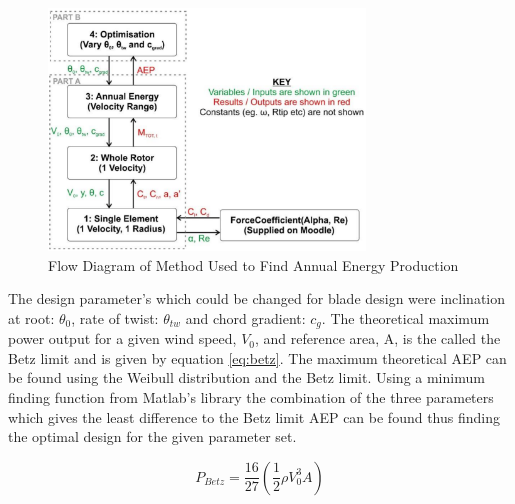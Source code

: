 \documentclass[11pt]{article}
\begin{document}
\begin{figure}[h!]
\centering
	\includegraphics[width=0.75\textwidth]{HandoutFlow}
	\caption{Flow Diagram of Method Used to Find Annual Energy Production \cite{handout}}\label{fig:handoutflow}
\end{figure}

The design parameter's which could be changed for blade design were inclination at root: $\theta_0$, rate of twist: $\theta_{tw}$ and chord gradient: $c_g$. The theoretical maximum power output for a given wind speed, $V_0$, and reference area, A, is the called the Betz limit and is given by equation \ref{eq:betz}. The maximum theoretical AEP can be found using the Weibull distribution and the Betz limit. Using a minimum finding function from Matlab's library the combination of the three parameters which gives the least difference to the Betz limit AEP can be found thus finding the optimal design for the given parameter set.

\begin{equation}
	\label{eq:betz}
	P_{Betz} = \frac{16}{27} \left ( \frac{1}{2} \rho V_0^3 A \right )
\end{equation}
\FloatBarrier
\end{document}
